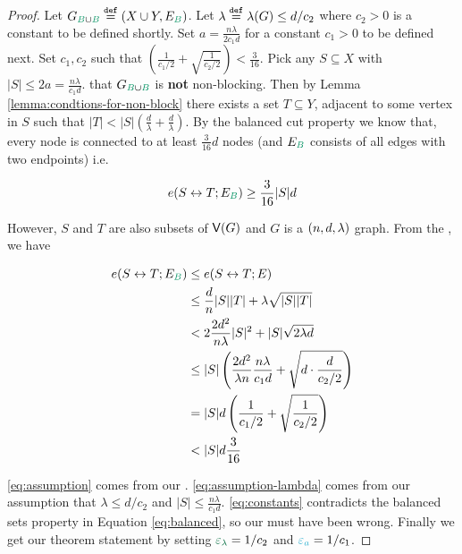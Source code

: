 \documentclass[11pt]{article}
\begin{document}
\begin{proof}
Let $\BipartiteG \Def (X \cup Y, E_{\GreenB})$. 
Let $\lambda \text{}\overset{\mathtt{def}}{=} \lambda(G) \leq d/c_2$ where $c_2 > 0$ is a constant to be defined shortly.
Set $a = \frac{n\lambda}{2c_1 d}$ for a constant $c_1 > 0$ to be defined next.
Set $c_1, c_2$ such that $\left(\frac{1}{c_1/2}  + \sqrt{\frac{1}{c_2/2}}\right) < \frac{3}{16}$.
Pick any $S \subseteq X$ with $|S| \leq 2a = \frac{n\lambda}{c_1 d}$.
 that $\BipartiteG$ is \textbf{not} non-blocking.
  Then by Lemma \ref{lemma:condtions-for-non-block} there exists a set $T \subseteq Y$, adjacent to some vertex in $S$ such that $|T| < |S|(\frac{d}{\lambda}+\frac{d}{\lambda})$. 
By the balanced cut property we know that, every  node is connected to at least $\frac{3}{16}d$  nodes (and $E_{\GreenB}$ consists of all edges with two  endpoints) i.e.

\begin{equation}\label{eq:balanced}
  \CutEdges{S}{T}{E_{\GreenB}} \geq \frac{3}{16}|S|d
\end{equation}

However, $S$ and $T$ are also subsets of $\mathsf{V}(G)$ and $G$ is a $(n, d, \lambda)$ graph.
From the , we have

\begin{align}
  \CutEdges{S}{T}{E_{\GreenB}} &\leq   \CutEdges{S}{T}{E} \\
  &\leq \frac{d}{n}|S||T| + \lambda\sqrt{|S||T|} \\
	&< 2\frac{2d^2}{n\lambda}|S|^2 + |S|\sqrt{2\lambda d} \label{eq:assumption}\\
	&\leq |S|\left(\frac{2d^2}{\lambda n} \frac{n\lambda}{c_1 d} + \sqrt{d\cdot \frac{d}{c_2/2}}\right) \label{eq:assumption-lambda}\\
	&= |S|d\left(\frac{1}{c_1/2}  + \sqrt{\frac{1}{c_2/2}}\right) \\
	&< |S|d\frac{3}{16} \label{eq:constants}
\end{align}

\eqref{eq:assumption} comes from our .
\eqref{eq:assumption-lambda} comes from our assumption that $\lambda \leq d/c_2$ and $|S| \leq \frac{n\lambda}{c_1 d}$.
\eqref{eq:constants} contradicts the balanced sets property in Equation \eqref{eq:balanced}, so our  must have been wrong.
Finally we get our theorem statement by setting $\epsilonL = 1/c_2$ and $\epsilonA = 1/c_1$.

\end{proof}
\end{document}
